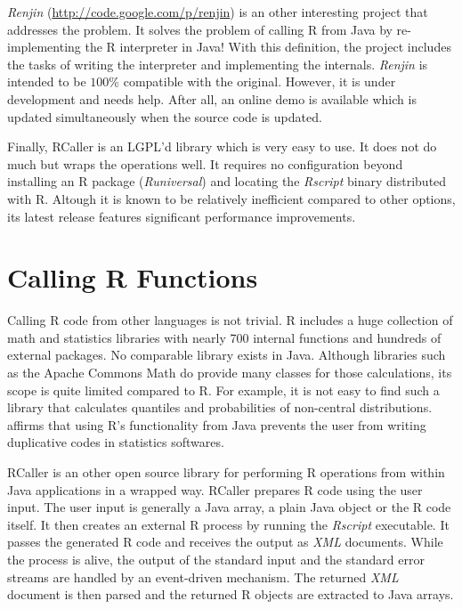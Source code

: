 \documentclass[10pt,a4paper]{article}
\begin{document}
\emph{Renjin} (\url {http://code.google.com/p/renjin}) is an other interesting project that addresses the problem. 
It solves the problem of calling R from Java by re-implementing the R interpreter in Java! With this definition, the project includes the tasks of writing the interpreter and implementing the internals.
\emph{Renjin} is intended to be $100$\% compatible with the original. However, it is under development and needs help. After all, 
an online demo is available which is updated simultaneously when the source code is updated.

Finally, RCaller \cite{RCaller} is an LGPL'd library which is very easy to use. It does not do much but wraps the operations well. 
It requires no configuration beyond installing an R package (\emph{Runiversal}) and locating the \emph{Rscript} binary distributed with R. 
Altough it is known to be relatively inefficient compared to other options, its latest release features significant performance improvements.


\section{Calling R Functions}
Calling R code from other languages is not trivial. R includes a huge collection of math and statistics libraries 
with nearly 700 internal functions and hundreds of external packages. No comparable library exists in Java. Although
libraries such as the Apache Commons Math \cite{CMath21} do provide many classes for those calculations, its scope is quite limited compared to R. For 
example, it is not easy to find such a library that calculates quantiles and probabilities
of non-central distributions. \cite{Harner:2009} affirms that using R's functionality from Java prevents the user from
writing duplicative codes in statistics softwares.

RCaller is an other open source library for performing R operations from within Java applications in a wrapped way. 
RCaller prepares R code using the user input. The user input is generally a Java array, a plain Java object or the R code itself.
It then creates an external R process by running the \emph{Rscript} executable. It passes the generated R code and receives the
output as \emph{XML} documents. While the process is alive, the output of the standard input and the standard error streams are handled by 
an event-driven mechanism. The returned \emph{XML} document is then parsed and the returned R objects are extracted to Java arrays.
\end{document}
